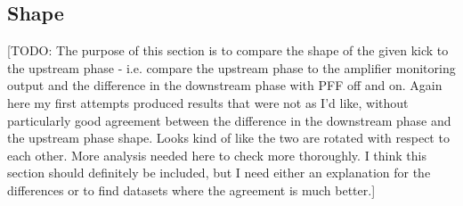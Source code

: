 %
%

\subsection{Shape}
\label{ss:kickShape}

[TODO: The purpose of this section is to compare the shape of the given kick to the upstream phase - i.e. compare the upstream phase to the amplifier monitoring output and the difference in the downstream phase with PFF off and on. Again here my first attempts produced results that were not as I'd like, without particularly good agreement between the difference in the downstream phase and the upstream phase shape. Looks kind of like the two are rotated with respect to each other. More analysis needed here to check more thoroughly. I think this section should definitely be included, but I need either an explanation for the differences or to find datasets where the agreement is much better.]

